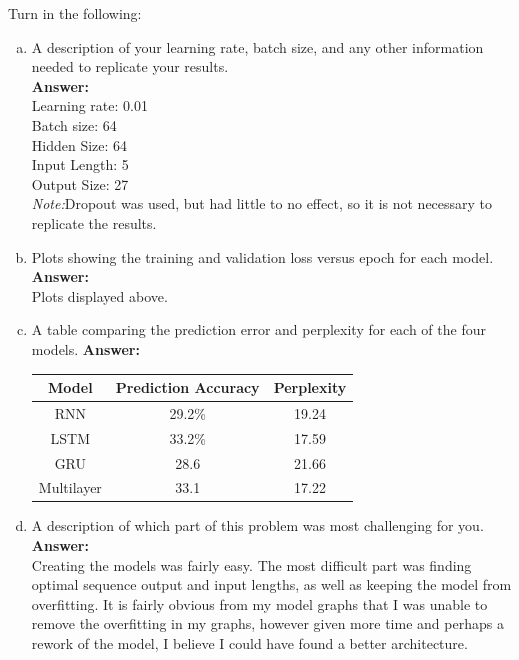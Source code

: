 \documentclass{article}[12pt]
\begin{document}
Turn in the following:
\begin{enumerate}[(a)]
    \item A description of your learning rate, batch size, and any other information needed to replicate your results. \\
    \textbf{Answer:}\\
    Learning rate: 0.01\\
    Batch size: 64\\
    Hidden Size: 64 \\
    Input Length: 5\\
    Output Size: 27\\
    \emph{Note:}Dropout was used, but had little to no effect, so it is not necessary to replicate the results.


    \item Plots showing the training and validation loss versus epoch for each model.
    \textbf{Answer:}\\
    Plots displayed above.
    \item A table comparing the prediction error and perplexity for each of the four models.
    \textbf{Answer:}\\
    \begin{tabular}{|c|c|c|}
        \hline
        Model & Prediction Accuracy & Perplexity \\
        \hline
        RNN & 29.2\% & 19.24 \\
        \hline
        LSTM & 33.2\% & 17.59 \\
        \hline
        GRU & 28.6 & 21.66 \\
        \hline
        Multilayer & 33.1 & 17.22 \\
        \hline
    \end{tabular}

    \item A description of which part of this problem was most challenging for you.
    \textbf{Answer:}\\
    Creating the models was fairly easy. The most difficult part was finding optimal sequence output and input lengths, as well as keeping the model from overfitting. It is fairly obvious from my model graphs that I was unable to remove the overfitting in my graphs, however given more time and perhaps a rework of the model, I believe I could have found a better architecture.
\end{enumerate}

\section{}
\end{document}
